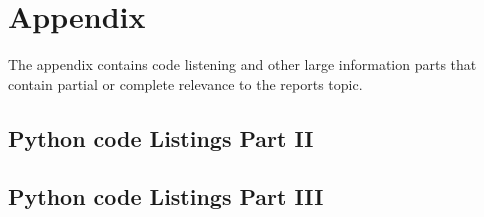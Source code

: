 \section{Appendix} \label{sec: Appendix}
The appendix contains code listening and other large information parts that contain partial or complete relevance to the reports topic. 

\subsection{Python code Listings Part II} \label{subsec: Python code Listings Part II}
%


\subsection{Python code Listings Part III} \label{subsec: Python code Listings Part III}



